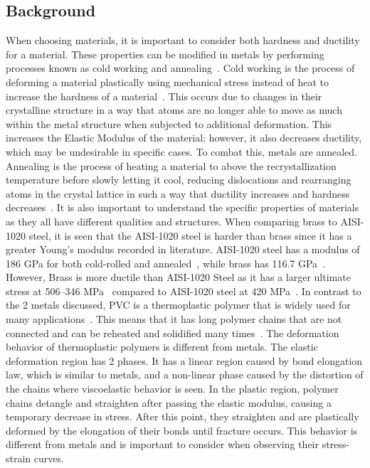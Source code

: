 \documentclass[11pt]{article}
\begin{document}
        \subsection{Background}
            When choosing materials, it is important to consider both hardness and ductility for a material. 
            These properties can be modified in metals by performing processes known as cold working and annealing~\cite{LM2023}. 
            Cold working is the process of deforming a material plastically using mechanical stress instead of heat to increase the hardness of a material~\cite{Arianto2019}. 
            This occurs due to changes in their crystalline structure in a way that atoms are no longer able to move as much within the metal structure when subjected to additional deformation. 
            This increases the Elastic Modulus of the material; however, it also decreases ductility, which may be undesirable in specific cases. 
            To combat this, metals are annealed. 
            Annealing is the process of heating a material to above the recrystallization temperature before slowly letting it cool, reducing dislocations and rearranging atoms in the crystal lattice in such a way that ductility increases and hardness decreases~\cite{Emordi2020}. 
            It is also important to understand the specific properties of materials as they all have different qualities and structures. 
            When comparing brass to AISI-1020 steel, it is seen that the AISI-1020 steel is harder than brass since it has a greater Young's modulus recorded in literature. 
            AISI-1020 steel has a modulus of 186 GPa for both cold-rolled and annealed~\cite{SAE1999}, while brass has 116.7 GPa~\cite{Lin2016}. 
            However, Brass is more ductile than AISI-1020 Steel as it has a larger ultimate stress at 506--346 MPa~\cite{Li2012} compared to AISI-1020 steel at 420 MPa~\cite{SAE1999}. 
            In contrast to the 2 metals discussed, PVC is a thermoplastic polymer that is widely used for many applications~\cite{Norvydas2013}. 
            This means that it has long polymer chains that are not connected and can be reheated and solidified many times~\cite{Douglas2014}. 
            The deformation behavior of thermoplastic polymers is different from metals. 
            The elastic deformation region has 2 phases. 
            It has a linear region caused by bond elongation law, which is similar to metals, and a non-linear phase caused by the distortion of the chains where viscoelastic behavior is seen. 
            In the plastic region, polymer chains detangle and straighten after passing the elastic modulus, causing a temporary decrease in stress. 
            After this point, they straighten and are plastically deformed by the elongation of their bonds until fracture occurs. 
            This behavior is different from metals and is important to consider when observing their stress-strain curves.
\end{document}
